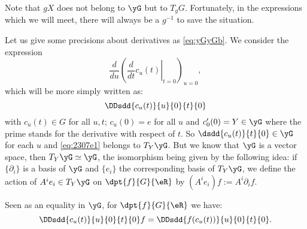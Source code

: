 Note that $gX$ does not belong to $\yG$ but to $T_{g}G$. Fortunately, in the expressions which we will meet, there will  always be a $g^{-1}$ to save the situation.

Let us give some precisions about derivatives as \eqref{eq:yGyGb}. We consider the expression
\[
	\frac{d}{du}\left( \left.\frac{d}{dt} c_u(t)\right|_{t=0}\right)_{u=0},
\]
which will be more simply written as:
\begin{equation}\label{eq:2307e1}
	\DDsdd{ c_u(t) }{u}{0}{t}{0}
\end{equation}
with $c_u(t)\in G$ for all $u,t$; $c_u(0)=e$ for all $u$ and $c_0'(0)=Y\in\yG$ where the prime stands for the derivative with respect of $t$. So $\dsdd{c_u(t)}{t}{0}\in\yG$ for each $u$ and \eqref{eq:2307e1} belongs to $T_Y\yG$. But we know that $\yG$ is a vector space, then $T_Y\yG\simeq\yG$, the isomorphism being given by the following idea: if $\{\partial_i\}$ is a basis of $\yG$ and $\{e_i\}$ the corresponding basis of $T_Y\yG$, we define the action of $A^ie_i\in T_Y\yG$ on $\dpt{f}{G}{\eR}$ by $(A^ie_i)f:=A^i\partial_if$.

\begin{lemma}
	Seen as an equality in $\yG$, for $\dpt{f}{G}{\eR}$ we have:
	\begin{equation}
		\DDsdd{c_u(t)}{u}{0}{t}{0}f=\DDsdd{f(c_u(t))}{u}{0}{t}{0}.
	\end{equation}
\end{lemma}

